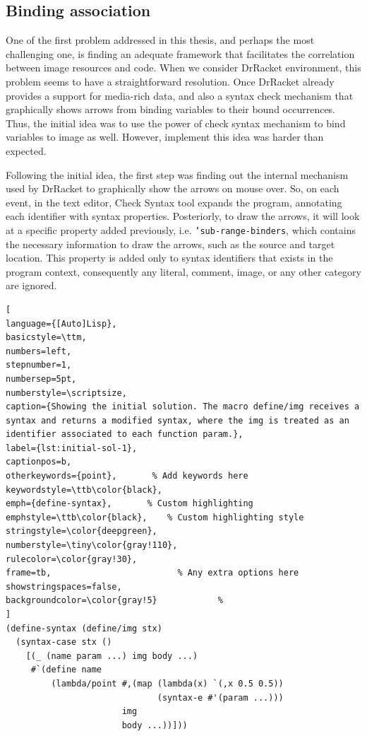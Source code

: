 \subsection{Binding association}

One of the first problem addressed in this thesis, and perhaps the most challenging one, is finding an adequate framework that facilitates the correlation between image resources and code. When we consider DrRacket environment, this problem seems to have a straightforward resolution. Once DrRacket already provides a support for media-rich data, and also a syntax check mechanism that graphically shows arrows from binding variables to their bound occurrences. Thus, the initial idea was to use the power of check syntax mechanism to bind variables to image as well. However, implement this idea was harder than expected.

Following the initial idea, the first step was finding out the internal mechanism used by DrRacket to graphically show the arrows on mouse over. So, on each event, in the text editor, Check Syntax tool expands the program, annotating each identifier with syntax properties. Posteriorly, to draw the arrows, it will look at a specific property added previously, i.e. \texttt{'sub-range-binders}, which contains the necessary information to draw the arrows, such as the source and target location. This property is added only to syntax identifiers that exists in the program context, consequently any literal, comment, image, or any other category are ignored.\\

\begin{lstlisting}[
language={[Auto]Lisp},
basicstyle=\ttm,
numbers=left,
stepnumber=1,
numbersep=5pt,                   
numberstyle=\scriptsize, 
caption={Showing the initial solution. The macro define/img receives a syntax and returns a modified syntax, where the img is treated as an identifier associated to each function param.},
label={lst:initial-sol-1},
captionpos=b, 
otherkeywords={point},       % Add keywords here
keywordstyle=\ttb\color{black},
emph={define-syntax},       % Custom highlighting
emphstyle=\ttb\color{black},    % Custom highlighting style
stringstyle=\color{deepgreen},
numberstyle=\tiny\color{gray!110},
rulecolor=\color{gray!30},
frame=tb,                         % Any extra options here
showstringspaces=false,
backgroundcolor=\color{gray!5}            % 
]
(define-syntax (define/img stx)
  (syntax-case stx ()
    [(_ (name param ...) img body ...)
     #`(define name 
         (lambda/point #,(map (lambda(x) `(,x 0.5 0.5)) 
                              (syntax-e #'(param ...)))
                       img
                       body ...))]))
\end{lstlisting}


